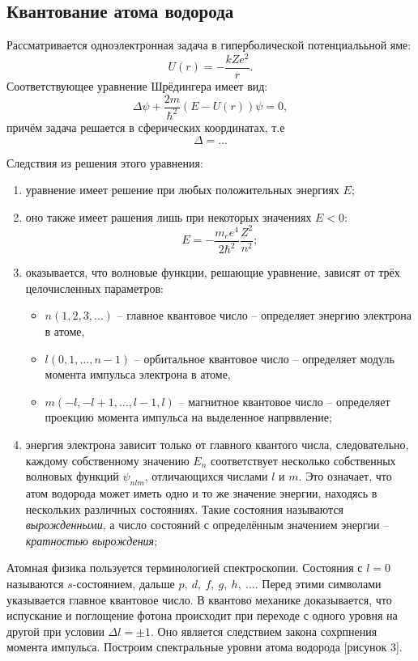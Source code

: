 \subsection{Квантование атома водорода}
Рассматривается одноэлектронная задача в гиперболической потенциалььной яме:
\[
    U(r) = -\frac{kZe^2}{r}.
\]
Соответствующее уравнение Шрёдингера имеет вид:
\[
    \Delta\psi + \frac{2m}{\hbar^2}(E-U(r))\psi = 0,
\]
причём задача решается в сферических координатах, т.е 
\[
    \Delta = ...
\]

Следствия из решения этого уравнения:
\begin{enumerate}
    \item уравнение имеет решение при любых положительных энергиях \( E \);
    \item оно также имеет рашения лишь при некоторых значениях \( E < 0 \):
    \[
        E = -\frac{m_e e^4}{2\hbar^2}\frac{Z^2}{n^2};
    \]
    \item оказывается, что волновые функции, решающие уравнение, зависят от трёх
    целочисленных параметров:
    \begin{itemize}
        \item \( n (1, 2, 3, \ldots) \) -- главное квантовое число -- определяет
        энергию электрона в атоме,
        \item \( l (0, 1, \ldots, n-1) \) -- орбитальное квантовое число --
        определяет модуль момента импульса электрона в атоме,
        \item \( m (-l, -l+1, \ldots, l-1, l) \) -- магнитное квантовое число --
        определяет проекцию момента импульса на выделенное напрввление;
    \end{itemize}
       
    \item энергия электрона зависит только от главного квантого числа,
    следовательно, каждому собственному значению \( E_n \) соответствует
    несколько собственных волновых функций \(\psi_{nlm}\), отличающихся числами
    \( l \) и \( m \). Это означает, что атом водорода может иметь одно и то же
    значение энергии, находясь в нескольких различных состояниях. Такие
    состояния называются \emph{вырожденными}, а число состояний с определённым
    значением энергии -- \emph{кратностью вырождения};
\end{enumerate}

Атомная физика пользуется терминологией спектроскопии. Состояния с \( l=0 \)
называются \( s \)-состоянием, дальше \( p,\ d,\ f,\ g,\ h,\ \ldots \). Перед
этими символами указывается главное квантовое число. В квантово механике
доказывается, что испускание и поглощение фотона происходит при переходе
с одного уровня на другой при условии \( \Delta l = \pm1 \). Оно является
следствием закона сохрпнения момента импульса. Построим спектральные уровни
атома водорода [рисунок 3].

